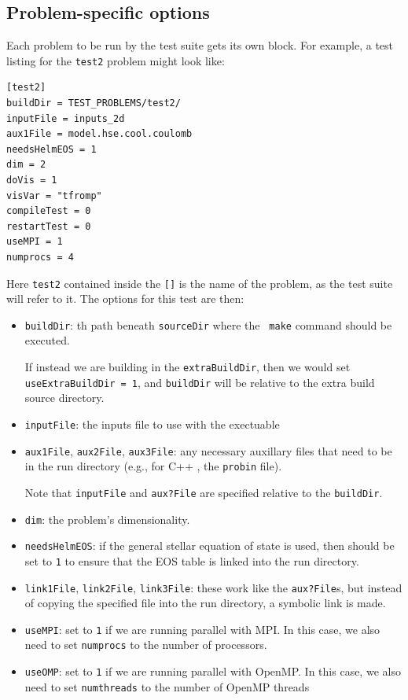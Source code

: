 \subsection{Problem-specific options}

Each problem to be run by the test suite gets its own block.  For
example, a test listing for the {\tt test2} problem might look like:

\begin{lstlisting}
[test2]
buildDir = TEST_PROBLEMS/test2/
inputFile = inputs_2d
aux1File = model.hse.cool.coulomb
needsHelmEOS = 1
dim = 2
doVis = 1
visVar = "tfromp"
compileTest = 0 
restartTest = 0
useMPI = 1
numprocs = 4
\end{lstlisting}

Here {\tt test2} contained inside the {\tt []} is the name of the
problem, as the test suite will refer to it.  The options
for this test are then:
\begin{itemize}
\item {\tt buildDir}: th path beneath {\tt sourceDir} where the {\tt
  make} command should be executed.

  If instead we are building in the {\tt extraBuildDir}, then we would
  set {\tt useExtraBuildDir = 1}, and {\tt buildDir} will be relative
  to the extra build source directory.

\item {\tt inputFile}: the inputs file to use with the exectuable

\item {\tt aux1File}, {\tt aux2File}, {\tt aux3File}: any necessary
  auxillary files that need to be in the run directory (e.g., for C++
  \boxlib, the {\tt probin} file).

  Note that {\tt inputFile} and {\tt aux?File} are specified relative
  to the {\tt buildDir}.

\item {\tt dim}: the problem's dimensionality.

\item {\tt needsHelmEOS}: if the general stellar equation of state is
  used, then should be set to {\tt 1} to ensure that the EOS table is
  linked into the run directory.

\item {\tt link1File}, {\tt link2File}, {\tt link3File}: these work
  like the {\tt aux?File}s, but instead of copying the specified file
  into the run directory, a symbolic link is made.

\item {\tt useMPI}: set to {\tt 1} if we are running parallel with
  MPI.  In this case, we also need to set {\tt numprocs} to the number
  of processors.

\item {\tt useOMP}: set to {\tt 1} if we are running parallel with
  OpenMP.  In this case, we also need to set {\tt numthreads} to the
  number of OpenMP threads
\end{itemize}

